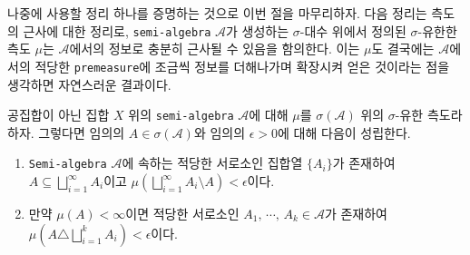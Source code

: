 나중에 사용할 정리 하나를 증명하는 것으로 이번 절을 마무리하자. 다음 정리는 측도의 근사에 대한 정리로, \texttt{semi-algebra} $\mathcal{A}$가 생성하는 $\sigma$-대수 위에서 정의된 $\sigma$-유한한 측도 $\mu$는 $\mathcal{A}$에서의 정보로 충분히 근사될 수 있음을 함의한다. 이는 $\mu$도 결국에는 $\mathcal{A}$에서의 적당한 \texttt{premeasure}에 조금씩 정보를 더해나가며 확장시켜 얻은 것이라는 점을 생각하면 자연스러운 결과이다.

\begin{theorem}\label{thm:measureApprox}
    공집합이 아닌 집합 $X$ 위의 \texttt{semi-algebra} $\mathcal{A}$에 대해 $\mu$를 $\sigma(\mathcal{A})$ 위의 $\sigma$-유한 측도라 하자. 그렇다면 임의의 $A\in\sigma(\mathcal{A})$와 임의의 $\epsilon>0$에 대해 다음이 성립한다.
    \begin{enumerate}
        \item \texttt{Semi-algebra} $\mathcal{A}$에 속하는 적당한 서로소인 집합열 $\{A_i\}$가 존재하여 $A\subseteq\bigsqcup_{i=1}^\infty A_i$이고 $\mu(\bigsqcup_{i=1}^\infty A_i\setminus A)<\epsilon$이다.
        \item 만약 $\mu(A)<\infty$이면 적당한 서로소인 $A_1,\,\cdots,\,A_k\in\mathcal{A}$가 존재하여 $\mu(A\triangle\bigsqcup_{i=1}^kA_i)<\epsilon$이다.
    \end{enumerate}
\end{theorem}

